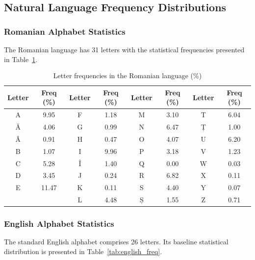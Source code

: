 \documentclass[12pt,a4paper]{article}
\begin{document}
\subsection{Natural Language Frequency Distributions}

\subsubsection{Romanian Alphabet Statistics}
The Romanian language has 31 letters with the statistical frequencies presented in Table~\ref{tab:romanian_freq}.

\begin{table}[H]
\centering
\caption{Letter frequencies in the Romanian language (\%)}
\label{tab:romanian_freq}
\small
\begin{tabular}{cc|cc|cc|cc}
\toprule
\textbf{Letter} & \textbf{Freq (\%)} & \textbf{Letter} & \textbf{Freq (\%)} & \textbf{Letter} & \textbf{Freq (\%)} & \textbf{Letter} & \textbf{Freq (\%)} \\
\midrule
A & 9.95 & F & 1.18 & M & 3.10 & T & 6.04 \\
Ă & 4.06 & G & 0.99 & N & 6.47 & Ț & 1.00 \\
Â & 0.91 & H & 0.47 & O & 4.07 & U & 6.20 \\
B & 1.07 & I & 9.96 & P & 3.18 & V & 1.23 \\
C & 5.28 & Î & 1.40 & Q & 0.00 & W & 0.03 \\
D & 3.45 & J & 0.24 & R & 6.82 & X & 0.11 \\
E & 11.47 & K & 0.11 & S & 4.40 & Y & 0.07 \\
  &      & L & 4.48 & Ș & 1.55 & Z & 0.71 \\
\bottomrule
\end{tabular}
\end{table}

\subsubsection{English Alphabet Statistics}
The standard English alphabet comprises 26 letters. Its baseline statistical distribution is presented in Table~\ref{tab:english_freq}.
\end{document}
